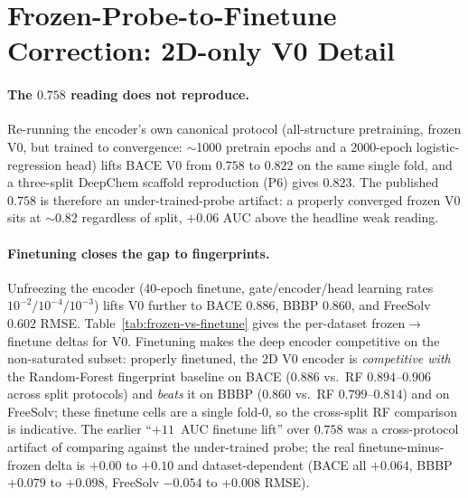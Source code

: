\documentclass[sigconf,nonacm,anonymous,review]{acmart}
\begin{document}
\section{Frozen-Probe-to-Finetune Correction: 2D-only V0 Detail}
\paragraph{The $0.758$ reading does not reproduce.}
Re-running the encoder's own canonical protocol (all-structure pretraining,
frozen V0, but trained to convergence: $\sim$1000 pretrain epochs and a
2000-epoch logistic-regression head) lifts BACE V0 from $0.758$ to
$0.822$ on the same single fold, and a three-split DeepChem scaffold
reproduction (P6) gives $0.823$. The published $0.758$ is therefore an
under-trained-probe artifact: a properly converged frozen V0 sits at
$\sim$0.82 regardless of split, $+0.06$ AUC above the headline weak reading.

\paragraph{Finetuning closes the gap to fingerprints.}
Unfreezing the encoder (40-epoch finetune, gate/encoder/head learning rates
$10^{-2}/10^{-4}/10^{-3}$) lifts V0 further to BACE $0.886$, BBBP $0.860$,
and FreeSolv $0.602$ RMSE. Table~\ref{tab:frozen-vs-finetune} gives the
per-dataset frozen$\to$finetune deltas for V0. Finetuning makes the deep
encoder competitive on the non-saturated subset: properly finetuned, the 2D
V0 encoder is \emph{competitive with} the Random-Forest fingerprint baseline on BACE ($0.886$ vs.\ RF $0.894$--$0.906$ across split protocols) and \emph{beats}
it on BBBP ($0.860$ vs.\ RF $0.799$--$0.814$) and on FreeSolv; these finetune cells are a single fold-0, so the cross-split RF comparison is indicative. The earlier
``$+11$~AUC finetune lift'' over $0.758$ was a cross-protocol artifact of
comparing against the under-trained probe; the real finetune-minus-frozen
delta is $+0.00$ to $+0.10$ and dataset-dependent (BACE all $+0.064$,
BBBP $+0.079$ to $+0.098$, FreeSolv $-0.054$ to $+0.008$ RMSE).
\end{document}
